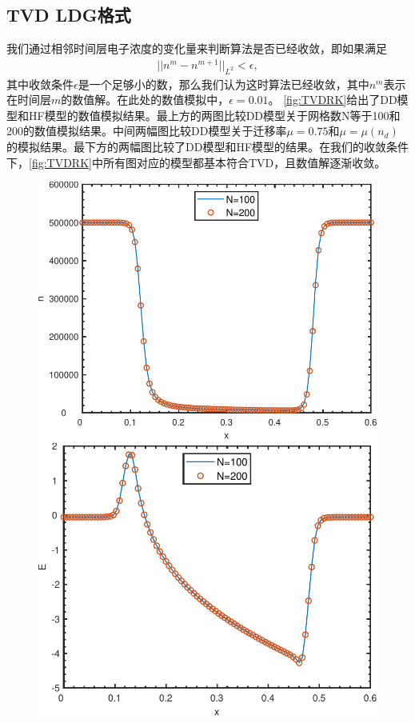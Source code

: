 \subsection{TVD LDG格式}
我们通过相邻时间层电子浓度的变化量来判断算法是否已经收敛，即如果满足
\begin{align*}
	||n^m - n^{m+1}||_{L^2} < \epsilon,
\end{align*}
其中收敛条件$\epsilon$是一个足够小的数，那么我们认为这时算法已经收敛，其中$n^m$表示在时间层$m$的数值解。在此处的数值模拟中，$\epsilon = 0.01$。
\autoref{fig:TVDRK}给出了DD模型和HF模型的数值模拟结果。最上方的两图比较DD模型关于网格数N等于100和200的数值模拟结果。中间两幅图比较DD模型关于迁移率$\mu=0.75$和$\mu = \mu(n_d)$的模拟结果。最下方的两幅图比较了DD模型和HF模型的结果。在我们的收敛条件下，\autoref{fig:TVDRK}中所有图对应的模型都基本符合TVD，且数值解逐渐收敛。
\begin{figure}
	\centering
	\begin{minipage}{0.45\linewidth}
		\centering
		\includegraphics[width=\linewidth]{figure/DDTVDRK3Degree2mu0.75Nn.pdf}
	\end{minipage}
	\hspace{1cm}
	\begin{minipage}{0.45\linewidth}
		\centering
		\includegraphics[width=\linewidth]{figure/DDTVDRK3Degree2mu0.75NE.pdf}

\end{minipage}
\end{figure}
